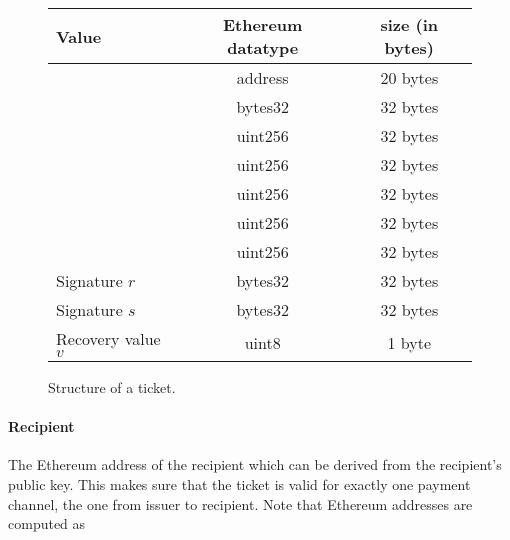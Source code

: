 \begin{figure}[H]
      \centering
      \begin{tabular}{|l|c|c|}
            \hline
            \textbf{Value}                                    & \textbf{Ethereum datatype} & \textbf{size (in bytes)} \\
            \hline
            \hline
            \nameref{sec:tickets:issuance:recipient}          & address                    & 20 bytes                 \\
            \nameref{sec:tickets:issuance:challenge}          & bytes32                    & 32 bytes                 \\
            \nameref{sec:tickets:issuance:ticketepoch}        & uint256                    & 32 bytes                 \\
            \nameref{sec:tickets:issuance:ticketvalue}        & uint256                    & 32 bytes                 \\
            \nameref{sec:tickets:issuance:winningprobability} & uint256                    & 32 bytes                 \\
            \nameref{sec:tickets:issuance:ticketindex}        & uint256                    & 32 bytes                 \\
            \nameref{sec:tickets:issuance:channelepoch}       & uint256                    & 32 bytes                 \\
            \hline
            \hline
            Signature $r$                                     & bytes32                    & 32 bytes                 \\
            Signature $s$                                     & bytes32                    & 32 bytes                 \\
            Recovery value $v$                                & uint8                      & 1 byte                   \\
            \hline
      \end{tabular}
      \caption{Structure of a ticket.}
\end{figure}

\paragraph{Recipient}
\label{sec:tickets:issuance:recipient}

The Ethereum address of the recipient which can be derived from the recipient's public key. This makes sure that the ticket is valid for exactly one payment channel, the one from issuer to recipient. Note that Ethereum addresses are computed as

